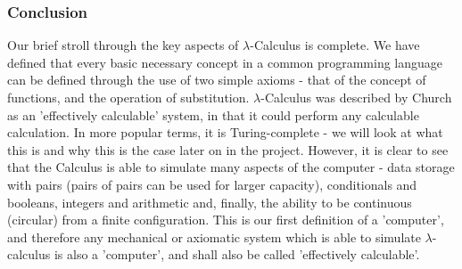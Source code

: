 \documentclass[Master.tex]{subfiles}
\begin{document}
\subsubsection{Conclusion}
Our brief stroll through the key aspects of $\lambda$-Calculus is complete. We have defined that every basic necessary concept in a common programming language can be defined through the use of two simple axioms - that of the concept of functions, and the operation of substitution. $\lambda$-Calculus was described by Church as an 'effectively calculable' system, in that it could perform any calculable calculation. In more popular terms, it is Turing-complete - we will look at what this is and why this is the case later on in the project. However, it is clear to see that the Calculus is able to simulate many aspects of the computer - data storage with pairs (pairs of pairs can be used for larger capacity), conditionals and booleans, integers and arithmetic and, finally, the ability to be continuous (circular) from a finite configuration. This is our first definition of a 'computer', and therefore any mechanical or axiomatic system which is able to simulate $\lambda$-calculus is also a 'computer', and shall also be called 'effectively calculable'.
\end{document}
